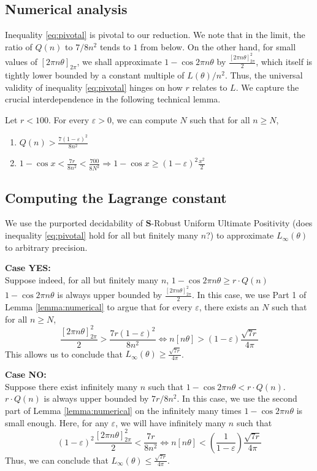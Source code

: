 \subsection{Numerical analysis}
Inequality \ref{eq:pivotal} is pivotal to our reduction. We note that in the limit, the ratio of $Q(n)$ to $7/8n^2$ tends to $1$ from below. On the other hand, for small values of $[2\pi n\theta]_{2\pi}$, we shall approximate $1 -\cos 2\pi n \theta$ by $\frac{[2\pi n\theta]_{2\pi}^2}{2}$, which itself is tightly lower bounded by a constant multiple of $L(\theta)/n^2$. Thus, the universal validity of inequality \ref{eq:pivotal} hinges on how $r$ relates to $L$. We capture the crucial interdependence in the following technical lemma.

\begin{lemma}
\label{lemma:numerical}
Let $r < 100$. For every $\varepsilon > 0$, we can compute $N$ such that for all $n \ge N$,
\begin{enumerate}
\item $Q(n) > \frac{7(1-\varepsilon)^2}{8n^2}$
\item $1 - \cos x < \frac{7r}{8n^2} < \frac{700}{8N^2}  \Rightarrow 1- \cos x \ge (1 - \varepsilon)^2\frac{x^2}{2}$
\end{enumerate}
\end{lemma}

\subsection{Computing the Lagrange constant}
We use the purported decidability of $\mathbf{S}$-Robust Uniform Ultimate Positivity (does inequality \ref{eq:pivotal} hold for all but finitely many $n$?) to approximate $L_\infty(\theta)$ to arbitrary precision. 

\textbf{Case YES:} \\
Suppose indeed, for all but finitely many $n$,
$
1 - \cos 2\pi n\theta \ge r \cdot Q(n)
$ \\
$1 - \cos 2\pi n\theta$ is always upper bounded by $\frac{[2\pi n\theta]_{2\pi}^2}{2}$. In this case, we use Part 1 of Lemma \ref{lemma:numerical} to argue that for every $\varepsilon$, there exists an $N$ such that for all $n \ge N$,
$$
\frac{[2\pi n \theta]_{2\pi}^2}{2} > \frac{7r(1 - \varepsilon)^2}{8n^2} \Leftrightarrow n[n\theta] > (1 - \varepsilon)\frac{\sqrt{7r}}{4\pi}
$$
This allows us to conclude that $L_\infty(\theta) \ge \frac{\sqrt{7r}}{4\pi}$.

\textbf{Case NO:} \\
Suppose there exist infinitely many $n$ such that 
$
1 - \cos 2\pi n\theta < r \cdot Q(n)
$. \\
$r \cdot Q(n)$ is always upper bounded by $7r/8n^2$. In this case, we use the second part of Lemma \ref{lemma:numerical} on the infinitely many times $1 - \cos 2\pi n\theta$ is small enough. Here, for any $\varepsilon$, we will have infinitely many $n$ such that
$$
(1 - \varepsilon)^2 \frac{[2\pi n \theta]_{2\pi}^2}{2} < \frac{7r}{8n^2} \Leftrightarrow n[n\theta] < \left(\frac{1}{1-\varepsilon}\right)\frac{\sqrt{7r}}{4\pi}
$$ 
Thus, we can conclude that $L_\infty(\theta) \le \frac{\sqrt{7r}}{4\pi}$.

